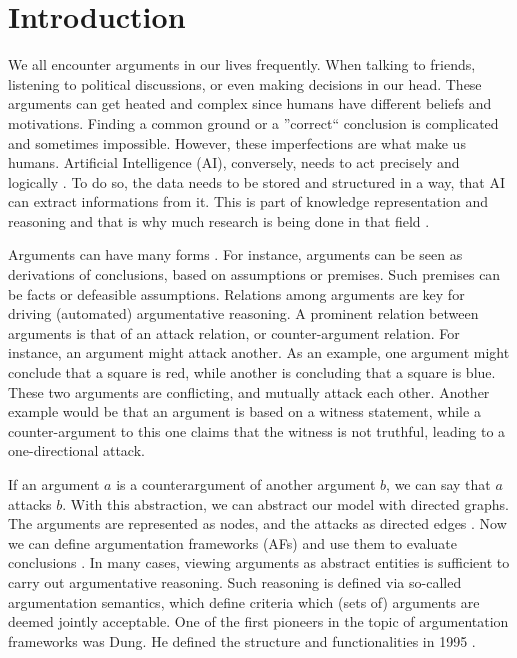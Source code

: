 \chapter{Introduction}
We all encounter arguments in our lives frequently. When talking to friends, listening to political discussions, or even making decisions in our head. These arguments can get heated and complex since humans have different beliefs and motivations. Finding a common ground or a ''correct`` conclusion is complicated and sometimes impossible. However, these imperfections are what make us humans. Artificial Intelligence (AI), conversely, needs to act precisely and logically \cite{DBLP:journals/frai/DietzKM24}. To do so, the data needs to be stored and structured in a way, that AI can extract informations from it. This is part of knowledge representation and reasoning and that is why much research is being done in that field \cite{DBLP:journals/dagstuhl-manifestos/DelgrandeG0TW24, DBLP:journals/inffus/PopescuD23}.

Arguments can have many forms \cite{Toulmin_2003}. For instance, arguments can be seen as derivations of conclusions, based on assumptions or premises. Such premises can be facts or defeasible assumptions. Relations among arguments are key for driving (automated) argumentative reasoning. A prominent relation between arguments is that of an attack relation, or counter-argument relation. For instance, an argument might attack another. As an example, one argument might conclude that a square is red, while another is concluding that a square is blue. These two arguments are conflicting, and mutually attack each other. Another example would be that an argument is based on a witness statement, while a counter-argument to this one claims that the witness is not truthful, leading to a one-directional attack.



If an argument $a$ is a counterargument of another argument $b$, we can say that $a$ attacks $b$. With this abstraction, we can abstract our model with directed graphs. The arguments are represented as nodes, and the attacks as directed edges \cite{DUNG1995321}. Now we can define argumentation frameworks (AFs) and use them to evaluate conclusions \cite{DBLP:conf/fapr/Geffner96}. In many cases, viewing arguments as abstract entities is sufficient to carry out argumentative reasoning. Such reasoning is defined via so-called argumentation semantics, which define criteria which (sets of) arguments are deemed jointly acceptable. One of the first pioneers in the topic of argumentation frameworks was Dung. He defined the structure and functionalities in 1995 \cite{Dung1995-DUNOTA-2}.

